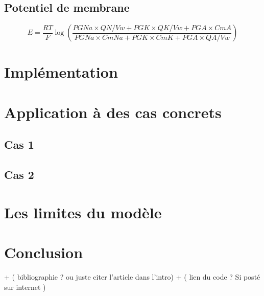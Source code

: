 \documentclass[a4paper,fleqn]{article}
\begin{document}
\subsection{Potentiel de membrane}

\begin{equation}
E =  \frac{RT}{F}\log{\left(\frac{{PGNa}\times{QN}/Vw + {PGK}\times{QK/Vw} + {PGA}\times{CmA}}{{PGNa}\times{CmNa} + {PGK}\times{CmK} + {PGA}\times{QA/Vw}}\right)}
\end{equation}

	

\section{Implémentation}   






\section{Application à des cas concrets}     

\subsection{Cas 1} 

\subsection{Cas 2} 

\section{Les limites du modèle}


\section{Conclusion} 

+ ( bibliographie ? ou juste citer l'article dans l'intro)
+ ( lien du code ? Si posté sur internet )
 







\end{document}
